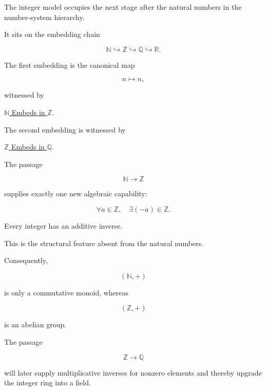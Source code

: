 
\begin{remark*}

The integer model occupies the next stage after the natural numbers in the
number-system hierarchy.

It sits on the embedding chain

\[
\mathbb N
\hookrightarrow
\mathbb Z
\hookrightarrow
\mathbb Q
\hookrightarrow
\mathbb R.
\]

The first embedding is the canonical map

\[
n \longmapsto n,
\]

witnessed by

\hyperref[thm:n-embeds-in-z]{$\mathbb N$ Embeds in $\mathbb Z$}.

The second embedding is witnessed by

\hyperref[thm:z-embeds-in-q]{$\mathbb Z$ Embeds in $\mathbb Q$}.

\end{remark*}


\begin{remark*}[Interpretation]

The passage

\[
\mathbb N
\longrightarrow
\mathbb Z
\]

supplies exactly one new algebraic capability:

\[
\forall a\in\mathbb Z,
\quad
\exists(-a)\in\mathbb Z.
\]

Every integer has an additive inverse.

This is the structural feature absent from the natural numbers.

Consequently,

\[
(\mathbb N,+)
\]

is only a commutative monoid, whereas

\[
(\mathbb Z,+)
\]

is an abelian group.

The passage

\[
\mathbb Z
\longrightarrow
\mathbb Q
\]

will later supply multiplicative inverses for nonzero elements and thereby
upgrade the integer ring into a field.

\end{remark*}

